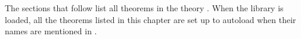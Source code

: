 \label{theorems}

The sections that follow list all theorems in the theory .
When the  library is loaded, all the theorems listed in
this chapter  are set up to autoload when their names are mentioned
in \ML.

